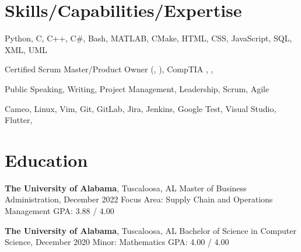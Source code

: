 \documentclass[hidelinks, 11pt]{article}
\begin{document}
\makecvtitle
\vspace{0.5mm}

\section{Skills/Capabilities/Expertise}

\begin{description}[widest=Programming Langauges:]
	\item[Programming Languages\normalfont:] Python, C, C++, C\#, Bash, MATLAB, CMake, HTML, CSS, JavaScript, SQL, XML, UML
	\item[Certifications\normalfont:] Certified Scrum Master/Product Owner (, ), CompTIA , , 
	\item[Soft Skills\normalfont:] Public Speaking, Writing, Project Management, Leadership, Scrum, Agile
	\item[Tools\normalfont:] Cameo, Linux, Vim, Git, GitLab, Jira, Jenkins, Google Test, Visual Studio, Flutter, 
\end{description}

\section{Education}
\begin{multicols}{2}
	\begin{minipage}{0.5\textwidth}
		\textbf{The University of Alabama}, Tuscaloosa, AL \newline
		Master of Business Administration, December 2022 \newline
		Focus Area: Supply Chain and Operations Management \newline
		GPA: 3.88 / 4.00
	\end{minipage}
	\begin{minipage}{0.5\textwidth}
		\textbf{The University of Alabama}, Tuscaloosa, AL \newline
		Bachelor of Science in Computer Science, December 2020 \newline
		Minor: Mathematics \newline
		GPA: 4.00 / 4.00
	\end{minipage}
\end{multicols}
\end{document}

